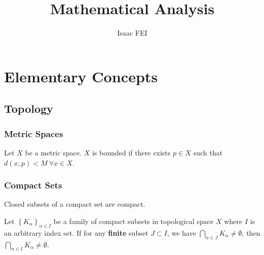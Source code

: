 \documentclass[thmcnt=section, 12pt]{elegantbook}
\title{Mathematical Analysis}
\author{Isaac FEI}
\begin{document}
\maketitle

\frontmatter
\tableofcontents
\mainmatter






\part{Elementary Concepts}




\chapter{Topology}


\section{Metric Spaces}


\begin{definition}
    Let $X$ be a metric space. $X$ is bounded if there exists $p \in X$ such that $d(x, p) < M \ \forall x \in X$.
\end{definition}


\section{Compact Sets}


\begin{theorem} \label{thm:9}
    Closed subsets of a compact set are compact.
\end{theorem}


\begin{theorem} \label{thm:10}
    Let $\left\{K_\alpha\right\}_{\alpha \in I}$ be a family of compact subsets in topological space $X$ where $I$ is an arbitrary index set. If for any \textbf{finite} subset $J \subset I$, we have $\bigcap_{\alpha \in J} K_\alpha \neq \emptyset$, then $\bigcap_{\alpha \in I} K_\alpha \neq \emptyset$.
\end{theorem}
\end{document}
